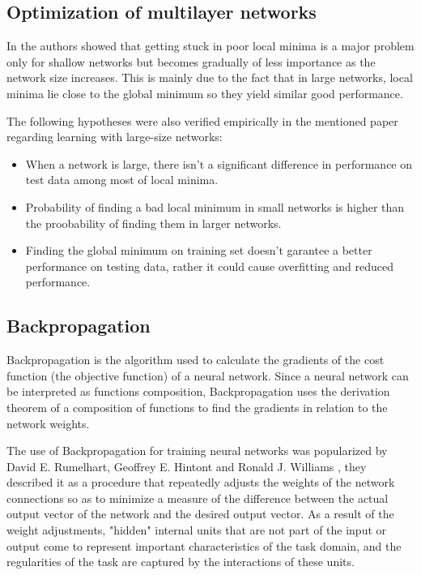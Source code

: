 \subsection{Optimization of multilayer networks}
In  \cite{Choromanska2014} the authors showed that getting stuck in poor local minima is a major problem only for shallow networks but becomes gradually of less importance as the network size increases. This is mainly due to the fact that in large networks, local minima lie close to the global minimum so they yield similar good performance.

The following hypotheses were also verified empirically in the mentioned paper regarding learning with large-size networks:
\begin{itemize}
    \item When a network is large, there isn't a significant difference in performance on test data among most of local minima.
    \item Probability of finding a bad local minimum in small networks is higher than the proobability of finding them in larger networks.
    \item Finding the global minimum on training set doesn't garantee a better performance on testing data, rather it could cause overfitting and reduced performance.
\end{itemize}

\subsection{Backpropagation}
Backpropagation is the algorithm used to calculate the gradients of the cost function (the objective function) of a neural network. Since a neural network can be interpreted as functions composition, Backpropagation uses the derivation theorem of a composition of functions to find the gradients in relation to the network weights.

The use of Backpropagation for training neural networks was popularized by David E. Rumelhart, Geoffrey E. Hintont and Ronald J. Williams \cite{Rumelhart1986}, they described it as a procedure that repeatedly adjusts the weights of the network connections so as to minimize a measure of the difference between the actual output vector of the network and the desired output vector. As a result of the weight adjustments, "hidden" internal units that are not part of the input or output come to represent important characteristics of the task domain, and the regularities of the task are captured by the interactions of these units.

